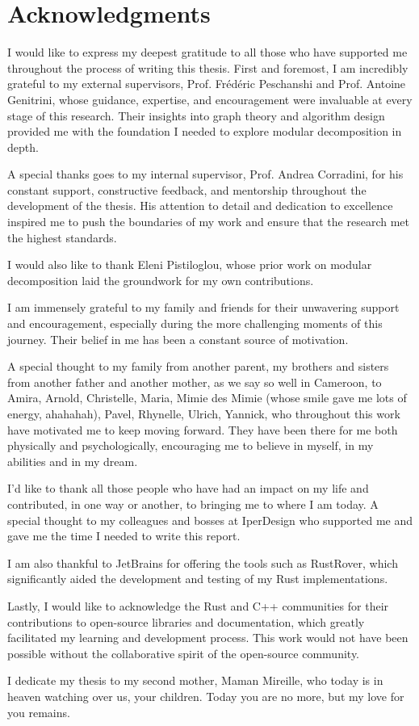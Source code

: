 

\chapter*{Acknowledgments}\label{ch:acknowledgments}

I would like to express my deepest gratitude to all those who have supported me throughout the process of writing this thesis.
First and foremost, I am incredibly grateful to my external supervisors, Prof. Frédéric Peschanshi and Prof. Antoine Genitrini, whose guidance, expertise, and encouragement were invaluable at every stage of this research.
Their insights into graph theory and algorithm design provided me with the foundation I needed to explore modular decomposition in depth.

A special thanks goes to my internal supervisor, Prof. Andrea Corradini, for his constant support, constructive feedback, and mentorship throughout the development of the thesis.
His attention to detail and dedication to excellence inspired me to push the boundaries of my work and ensure that the research met the highest standards.

I would also like to thank Eleni Pistiloglou, whose prior work on modular decomposition laid the groundwork for my own contributions.

I am immensely grateful to my family and friends for their unwavering support and encouragement, especially during the more challenging moments of this journey.
Their belief in me has been a constant source of motivation.

A special thought to my family from another parent, my brothers and sisters from another father and another mother, as we say so well in Cameroon, to Amira, Arnold, Christelle, Maria, Mimie des Mimie (whose smile gave me lots of energy, ahahahah), Pavel, Rhynelle, Ulrich, Yannick, who throughout this work have motivated me to keep moving forward.
They have been there for me both physically and psychologically, encouraging me to believe in myself, in my abilities and in my dream.

I'd like to thank all those people who have had an impact on my life and contributed, in one way or another, to bringing me to where I am today.
A special thought to my colleagues and bosses at IperDesign who supported me and gave me the time I needed to write this report.

I am also thankful to JetBrains for offering the tools such as RustRover, which significantly aided the development and testing of my Rust implementations.

Lastly, I would like to acknowledge the Rust and C++ communities for their contributions to open-source libraries and documentation, which greatly facilitated my learning and development process.
This work would not have been possible without the collaborative spirit of the open-source community.

I dedicate my thesis to my second mother, Maman Mireille, who today is in heaven watching over us, your children.
Today you are no more, but my love for you remains.


